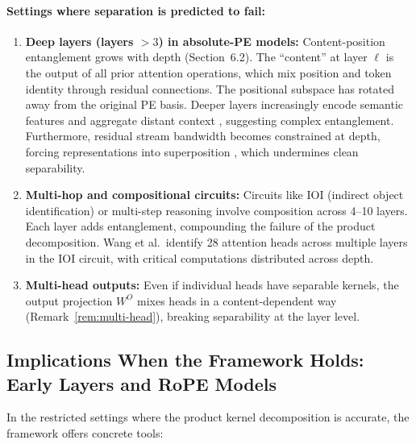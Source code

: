 \documentclass[11pt]{article}
\theoremstyle{definition}
\begin{document}
\paragraph{Settings where separation is predicted to fail:}
\begin{enumerate}
    \item \textbf{Deep layers (layers $>3$) in absolute-PE models:} Content-position entanglement grows with depth (Section~6.2). The ``content'' at layer $\ell$ is the output of all prior attention operations, which mix position and token identity through residual connections. The positional subspace has rotated away from the original PE basis. Deeper layers increasingly encode semantic features and aggregate distant context \cite{clark2019analyzing}, suggesting complex entanglement. Furthermore, residual stream bandwidth becomes constrained at depth, forcing representations into superposition \cite{elhage2022variables}, which undermines clean separability.
    \item \textbf{Multi-hop and compositional circuits:} Circuits like IOI (indirect object identification) \cite{wang2023interpretability} or multi-step reasoning involve composition across 4--10 layers. Each layer adds entanglement, compounding the failure of the product decomposition. Wang et al.\ identify 28 attention heads across multiple layers in the IOI circuit, with critical computations distributed across depth.
    \item \textbf{Multi-head outputs:} Even if individual heads have separable kernels, the output projection $W^O$ mixes heads in a content-dependent way (Remark~\ref{rem:multi-head}), breaking separability at the layer level.
\end{enumerate}

\subsection{Implications When the Framework Holds: Early Layers and RoPE Models}

In the restricted settings where the product kernel decomposition is accurate, the framework offers concrete tools:
\end{document}
